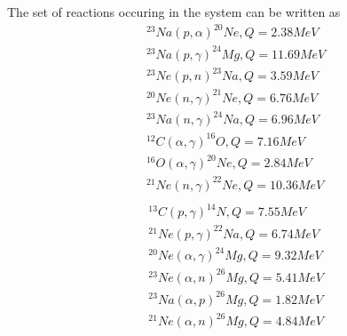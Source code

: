\documentclass[11pt]{article}
\begin{document}
	
	The set of reactions occuring in the system can be written as
	\begin{align}
		&^{23}Na(p, \alpha)^{20}Ne, Q = 2.38 MeV\\
		&^{23}Na(p, \gamma)^{24}Mg, Q = 11.69 MeV\\
		&^{23}Ne(p, n)^{23}Na, Q = 3.59 MeV\\
		&^{20}Ne(n, \gamma)^{21}Ne, Q = 6.76 MeV\\
		&^{23}Na(n, \gamma)^{24}Na, Q = 6.96 MeV\\
		&^{12}C(\alpha, \gamma)^{16}O, Q = 7.16 MeV\\
		&^{16}O(\alpha, \gamma)^{20}Ne, Q = 2.84 MeV\\	
		&^{21}Ne(n, \gamma)^{22}Ne, Q = 10.36 MeV\\
	\end{align}
	\begin{align}
		&^{13}C(p, \gamma)^{14}N, Q = 7.55 MeV\\
		&^{21}Ne(p, \gamma)^{22}Na, Q = 6.74 MeV\\
		&^{20}Ne(\alpha, \gamma)^{24}Mg, Q = 9.32 MeV\\
		&^{23}Ne(\alpha, n)^{26}Mg, Q = 5.41 MeV\\
		&^{23}Na(\alpha, p)^{26}Mg, Q = 1.82 MeV\\
		&^{21}Ne(\alpha, n)^{26}Mg, Q = 4.84 MeV	
	\end{align} \\
	
\end{document}
